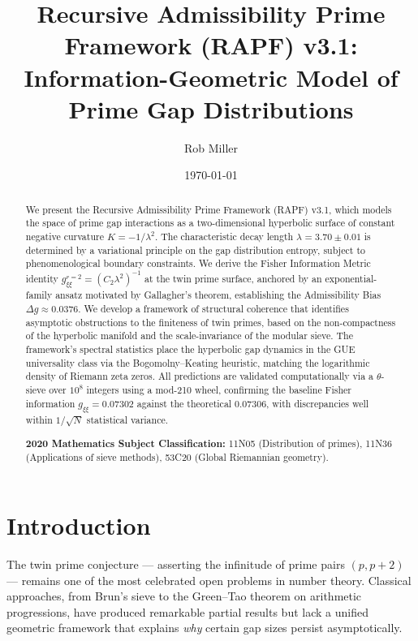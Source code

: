 \documentclass[12pt]{article}
\title{Recursive Admissibility Prime Framework (RAPF) v3.1:\\
Information-Geometric Model of Prime Gap Distributions}
\author{Rob Miller}
\date{\today}
\begin{document}
\maketitle

\begin{abstract}
We present the Recursive Admissibility Prime Framework (RAPF) v3.1, which
models the space of prime gap interactions as a two-dimensional hyperbolic
surface of constant negative curvature $K = -1/\lambda^2$. The characteristic
decay length $\lambda = 3.70 \pm 0.01$ is determined by a variational principle
on the gap distribution entropy, subject to phenomenological boundary constraints.
We derive the Fisher Information Metric identity $g_{\xi\xi}^{r=2} = (C_2 \lambda^2)^{-1}$
at the twin prime surface, anchored by an exponential-family ansatz motivated
by Gallagher's theorem, establishing the Admissibility Bias $\Delta g \approx 0.0376$.
We develop a framework of structural coherence that identifies asymptotic
obstructions to the finiteness of twin primes, based on the non-compactness of
the hyperbolic manifold and the scale-invariance of the modular sieve. The
framework's spectral statistics place the hyperbolic gap dynamics in the GUE
universality class via the Bogomolny--Keating heuristic, matching the logarithmic
density of Riemann zeta zeros. All predictions are validated computationally via
a $\theta$-sieve over $10^8$ integers using a mod-210 wheel, confirming the
baseline Fisher information $g_{\xi\xi} = 0.07302$ against the theoretical
$0.07306$, with discrepancies well within $1/\sqrt{N}$ statistical variance.

\vspace{0.2cm}
\noindent\textbf{2020 Mathematics Subject Classification:} 11N05 (Distribution of primes),
11N36 (Applications of sieve methods), 53C20 (Global Riemannian geometry).
\end{abstract}

\tableofcontents
\newpage

\section{Introduction}

The twin prime conjecture --- asserting the infinitude of prime pairs $(p, p+2)$
--- remains one of the most celebrated open problems in number theory. Classical
approaches, from Brun's sieve to the Green--Tao theorem on arithmetic progressions,
have produced remarkable partial results but lack a unified geometric framework that
explains \textit{why} certain gap sizes persist asymptotically.
\end{document}
